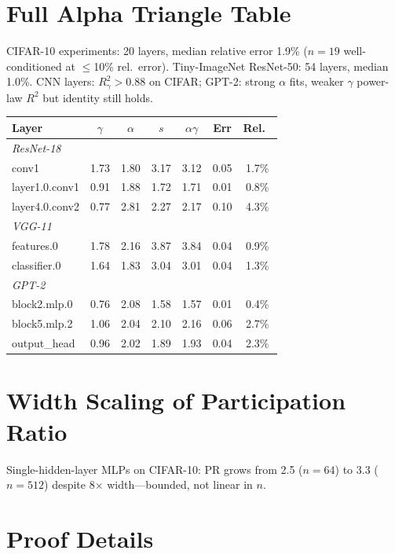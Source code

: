 \documentclass{article}
\begin{document}
\section{Full Alpha Triangle Table}\label{app:triangle}

CIFAR-10 experiments: 20 layers, median relative error 1.9\% ($n{=}19$ well-conditioned at $\leq$10\% rel.\ error). Tiny-ImageNet ResNet-50: 54 layers, median 1.0\%. CNN layers: $R^2_\gamma > 0.88$ on CIFAR; GPT-2: strong $\alpha$ fits, weaker $\gamma$ power-law $R^2$ but identity still holds.

\begin{center}
\scriptsize
\begin{tabular}{lcccccc}
\toprule
Layer & $\gamma$ & $\alpha$ & $s$ & $\alpha\gamma$ & Err & Rel.\ \\
\midrule
\multicolumn{7}{l}{\textit{ResNet-18}} \\
conv1 & 1.73 & 1.80 & 3.17 & 3.12 & 0.05 & 1.7\% \\
layer1.0.conv1 & 0.91 & 1.88 & 1.72 & 1.71 & 0.01 & 0.8\% \\
layer4.0.conv2 & 0.77 & 2.81 & 2.27 & 2.17 & 0.10 & 4.3\% \\
\multicolumn{7}{l}{\textit{VGG-11}} \\
features.0 & 1.78 & 2.16 & 3.87 & 3.84 & 0.04 & 0.9\% \\
classifier.0 & 1.64 & 1.83 & 3.04 & 3.01 & 0.04 & 1.3\% \\
\multicolumn{7}{l}{\textit{GPT-2}} \\
block2.mlp.0 & 0.76 & 2.08 & 1.58 & 1.57 & 0.01 & 0.4\% \\
block5.mlp.2 & 1.06 & 2.04 & 2.10 & 2.16 & 0.06 & 2.7\% \\
output\_head & 0.96 & 2.02 & 1.89 & 1.93 & 0.04 & 2.3\% \\
\bottomrule
\end{tabular}
\end{center}

\section{Width Scaling of Participation Ratio}\label{app:pr-scaling}

Single-hidden-layer MLPs on CIFAR-10: PR grows from 2.5 ($n=64$) to 3.3 ($n=512$) despite 8$\times$ width---bounded, not linear in $n$.

\section{Proof Details}\label{app:proofs}
\end{document}
